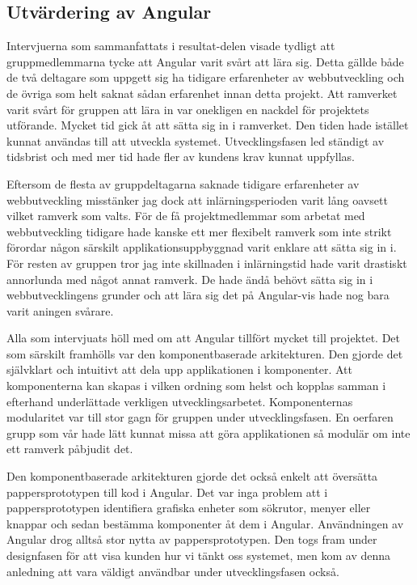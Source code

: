 \subsection{Utvärdering av Angular}

Intervjuerna som sammanfattats i resultat-delen visade tydligt att gruppmedlemmarna tycke att Angular varit svårt att lära sig. Detta gällde både de två deltagare som uppgett sig ha tidigare erfarenheter av webbutveckling och de övriga som helt saknat sådan erfarenhet innan detta projekt. Att ramverket varit svårt för gruppen att lära in var onekligen en nackdel för projektets utförande. Mycket tid gick åt att sätta sig in i ramverket. Den tiden hade istället kunnat användas till att utveckla systemet. Utvecklingsfasen led ständigt av tidsbrist och med mer tid hade fler av kundens krav kunnat uppfyllas.

Eftersom de flesta av gruppdeltagarna saknade tidigare erfarenheter av webbutveckling misstänker jag dock att inlärningsperioden varit lång oavsett vilket ramverk som valts. För de få projektmedlemmar som arbetat med webbutveckling tidigare hade kanske ett mer flexibelt ramverk som inte strikt förordar någon särskilt applikationsuppbyggnad varit enklare att sätta sig in i. För resten av gruppen tror jag inte skillnaden i inlärningstid hade varit drastiskt annorlunda med något annat ramverk. De hade ändå behövt sätta sig in i webbutvecklingens grunder och att lära sig det på Angular-vis hade nog bara varit aningen svårare. 

Alla som intervjuats höll med om att Angular tillfört mycket till projektet. Det som särskilt framhölls var den komponentbaserade arkitekturen. Den gjorde det självklart och intuitivt att dela upp applikationen i komponenter. Att komponenterna kan skapas i vilken ordning som helst och kopplas samman i efterhand underlättade verkligen utvecklingsarbetet. Komponenternas modularitet var till stor gagn för gruppen under utvecklingsfasen. En oerfaren grupp som vår hade lätt kunnat missa att göra applikationen så modulär om inte ett ramverk påbjudit det.

Den komponentbaserade arkitekturen gjorde det också enkelt att översätta pappersprototypen till kod i Angular. Det var inga problem att i pappersprototypen identifiera grafiska enheter som sökrutor, menyer eller knappar och sedan bestämma komponenter åt dem i Angular. Användningen av Angular drog alltså stor nytta av pappersprototypen. Den togs fram under designfasen för att visa kunden hur vi tänkt oss systemet, men kom av denna anledning att vara väldigt användbar under utvecklingsfasen också.

